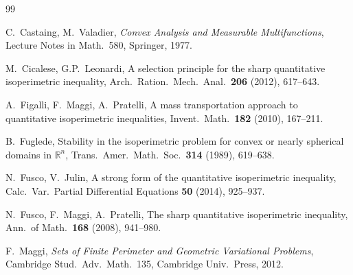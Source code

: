 \documentclass[11pt]{article}
\theoremstyle{definition}
\newcommand{\R}{\mathbb{R}}
\begin{document}
\begin{thebibliography}{99}

C.~Castaing, M.~Valadier,
\emph{Convex Analysis and Measurable Multifunctions},
Lecture Notes in Math.~580, Springer, 1977.

M.~Cicalese, G.P.~Leonardi,
A selection principle for the sharp quantitative isoperimetric
inequality,
Arch.\ Ration.\ Mech.\ Anal.\ \textbf{206} (2012), 617--643.

A.~Figalli, F.~Maggi, A.~Pratelli,
A mass transportation approach to quantitative isoperimetric
inequalities,
Invent.\ Math.\ \textbf{182} (2010), 167--211.

B.~Fuglede,
Stability in the isoperimetric problem for convex or nearly spherical
domains in \(\R^{n}\),
Trans.\ Amer.\ Math.\ Soc.\ \textbf{314} (1989), 619--638.

N.~Fusco, V.~Julin,
A strong form of the quantitative isoperimetric inequality,
Calc.\ Var.\ Partial Differential Equations \textbf{50} (2014),
925--937.

N.~Fusco, F.~Maggi, A.~Pratelli,
The sharp quantitative isoperimetric inequality,
Ann.\ of Math.\ \textbf{168} (2008), 941--980.

F.~Maggi,
\emph{Sets of Finite Perimeter and Geometric Variational Problems},
Cambridge Stud.\ Adv.\ Math.~135, Cambridge Univ.~Press, 2012.

\end{thebibliography}
\end{document}
